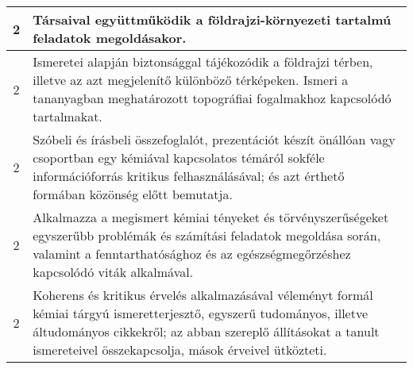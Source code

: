 \begin{longtable}{c | p{12cm} }
                                          2 &  Társaival együttműködik a földrajzi-környezeti tartalmú feladatok megoldásakor. \\ \hline
                                          2 &  Ismeretei alapján biztonsággal tájékozódik a földrajzi térben, illetve az azt megjelenítő különböző térképeken. Ismeri a tananyagban meghatározott topográfiai fogalmakhoz kapcsolódó tartalmakat. \\ \hline
                                          2 &  Szóbeli és írásbeli összefoglalót, prezentációt készít önállóan vagy csoportban egy kémiával kapcsolatos témáról sokféle információforrás kritikus felhasználásával; és azt érthető formában közönség előtt bemutatja. \\ \hline
                                          2 &  Alkalmazza a megismert kémiai tényeket és törvényszerűségeket egyszerűbb problémák és számítási feladatok megoldása során, valamint a fenntarthatósághoz és az egészségmegőrzéshez kapcsolódó viták alkalmával. \\ \hline
                                          2 &  Koherens és kritikus érvelés alkalmazásával véleményt formál kémiai tárgyú ismeretterjesztő, egyszerű tudományos, illetve áltudományos cikkekről; az abban szereplő állításokat a tanult ismereteivel összekapcsolja, mások érveivel ütközteti. \\ \hline
                                      

\end{longtable}
